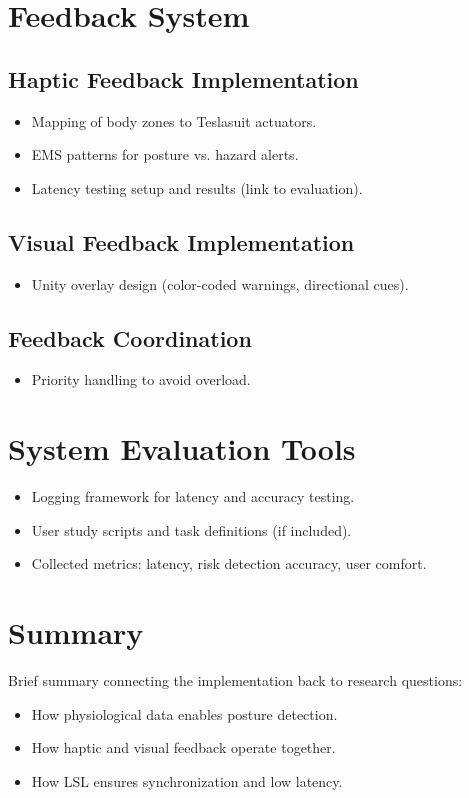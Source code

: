 \section{Feedback System}
\subsection{Haptic Feedback Implementation}
\begin{itemize}
    \item Mapping of body zones to Teslasuit actuators.
    \item EMS patterns for posture vs. hazard alerts.
    \item Latency testing setup and results (link to evaluation).
\end{itemize}

\subsection{Visual Feedback Implementation}
\begin{itemize}
    \item Unity overlay design (color-coded warnings, directional cues).
\end{itemize}

\subsection{Feedback Coordination}
\begin{itemize}
    \item Priority handling to avoid overload.
\end{itemize}

\section{System Evaluation Tools}
\begin{itemize}
    \item Logging framework for latency and accuracy testing.
    \item User study scripts and task definitions (if included).
    \item Collected metrics: latency, risk detection accuracy, user comfort.
\end{itemize}

\section{Summary}
Brief summary connecting the implementation back to research questions:
\begin{itemize}
    \item How physiological data enables posture detection.
    \item How haptic and visual feedback operate together.
    \item How LSL ensures synchronization and low latency.
\end{itemize}
